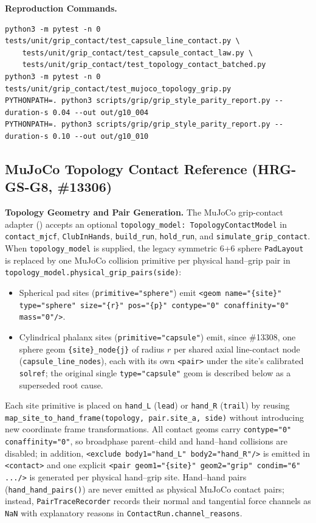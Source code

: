 \documentclass[11pt,a4paper]{article}
\begin{document}
\textbf{Reproduction Commands.}
\begin{verbatim}
python3 -m pytest -n 0 tests/unit/grip_contact/test_capsule_line_contact.py \
    tests/unit/grip_contact/test_capsule_contact_law.py \
    tests/unit/grip_contact/test_topology_contact_batched.py
python3 -m pytest -n 0 tests/unit/grip_contact/test_mujoco_topology_grip.py
PYTHONPATH=. python3 scripts/grip/grip_style_parity_report.py --duration-s 0.04 --out out/g10_004
PYTHONPATH=. python3 scripts/grip/grip_style_parity_report.py --duration-s 0.10 --out out/g10_010
\end{verbatim}

\subsection{MuJoCo Topology Contact Reference (HRG-GS-G8, \#13306)}
\label{sec:hrg-gs-mujoco-topology}
\textbf{Topology Geometry and Pair Generation.} The MuJoCo grip-contact adapter ()
accepts an optional \texttt{topology\_model: TopologyContactModel} in \texttt{contact\_mjcf}, \texttt{ClubInHands}, \texttt{build\_run}, \texttt{hold\_run}, and \texttt{simulate\_grip\_contact}.
When \texttt{topology\_model} is supplied, the legacy symmetric 6+6 sphere \texttt{PadLayout} is replaced by one MuJoCo collision primitive per physical hand--grip pair in \texttt{topology\_model.physical\_grip\_pairs(side)}:
\begin{itemize}[leftmargin=*,noitemsep]
\item Spherical pad sites (\texttt{primitive="sphere"}) emit \texttt{<geom name="\{site\}" type="sphere" size="\{r\}" pos="\{p\}" contype="0" conaffinity="0" mass="0"/>}.
\item Cylindrical phalanx sites (\texttt{primitive="capsule"}) emit, since \#13308, one sphere geom \texttt{\{site\}\_node\{j\}} of radius $r$ per shared axial line-contact node (\texttt{capsule\_line\_nodes}), each with its own \texttt{<pair>} under the site's calibrated \texttt{solref}; the original single \texttt{type="capsule"} geom is described below as a superseded root cause.
\end{itemize}
Each site primitive is placed on \texttt{hand\_L} (\texttt{lead}) or \texttt{hand\_R} (\texttt{trail}) by reusing \texttt{map\_site\_to\_hand\_frame(topology, pair.site\_a, side)} without introducing new coordinate frame transformations.
All contact geoms carry \texttt{contype="0" conaffinity="0"}, so broadphase parent--child and hand--hand collisions are disabled; in addition, \texttt{<exclude body1="hand\_L" body2="hand\_R"/>} is emitted in \texttt{<contact>} and one explicit \texttt{<pair geom1="\{site\}" geom2="grip" condim="6" .../>} is generated per physical hand--grip site.
Hand--hand pairs (\texttt{hand\_hand\_pairs()}) are never emitted as physical MuJoCo contact pairs; instead, \texttt{PairTraceRecorder} records their normal and tangential force channels as \texttt{NaN} with explanatory reasons in \texttt{ContactRun.channel\_reasons}.
\end{document}

